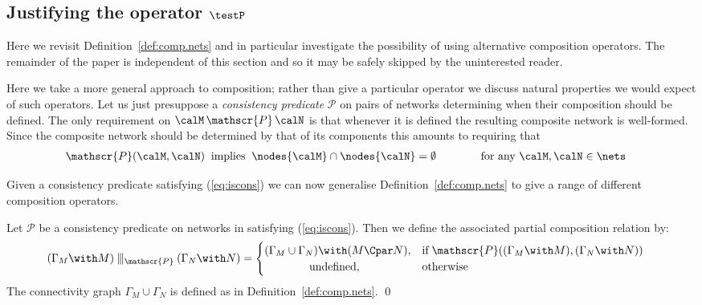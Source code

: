 \documentclass{LMCS}
\begin{document}
\subsection{Justifying the operator $\testP$}
\label{sec:justify}


Here we revisit Definition~\ref{def:comp.nets} and in particular investigate the possibility
of using alternative composition operators. The remainder of the paper is independent of this
section and so it may be safely skipped by the uninterested reader. 

Here we take a more general approach to composition; rather than give a particular operator we discuss
natural properties we would expect of such operators. Let us just presuppose a \emph{consistency predicate}
$\mathscr{P}$ on pairs of networks determining when their composition should be defined. The only requirement
on $\calM  \,\mathscr{P}\, \calN$ is that whenever it is  defined the resulting composite network is well-formed. 
Since the composite network should be  determined by that of its components this amounts to requiring that 
\begin{align}\label{eq:iscons}
  & \mathscr{P}(\calM, \calN) \;\;\text{implies}\;\; \nodes{\calM} \cap \nodes{\calN} = \emptyset 
   \qquad\qquad \text{for any $\calM, \calN \in \nets$}
\end{align}

\noindent Given a consistency predicate satisfying (\ref{eq:iscons}) we can now generalise Definition~\ref{def:comp.nets} to 
give a range of different composition operators. 
\begin{defi}\label{def:gen.comp.nets}
  Let $\mathscr{P}$ be a consistency  predicate on networks in \nets satisfying 
  (\ref{eq:iscons}). Then we define the associated partial composition
  relation by:
\begin{align*}
    &(\Gamma_M \with M ) \interleave_{\mathscr{P}} (\Gamma_N \with N) = 
    \begin{cases}
        (\Gamma_M \cup \Gamma_N ) \with (M \Cpar N), & \text{if}\;  \mathscr{P}((\Gamma_M \with M ), (\Gamma_N \with N)) \\
        \qquad\qquad\text{undefined},                          &\text{otherwise}
    \end{cases} 
\end{align*}
The connectivity graph $\Gamma_M \cup \Gamma_N$ is defined as in Definition~\ref{def:comp.nets}.
\qed 
\end{defi}
\end{document}
